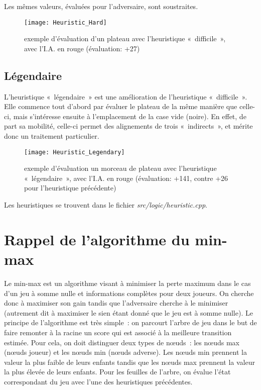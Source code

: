 Les mêmes valeurs, évaluées pour l'adversaire, sont soustraites.

\begin{figure}[H]
    \centering
    \texttt{[image: Heuristic\_Hard]}{}
    \caption{exemple d'évaluation d'un plateau avec l'heuristique « difficile », avec l'I.A. en rouge (évaluation: +27)}
\end{figure}

\subsection{Légendaire}

L'heuristique « légendaire » est une amélioration de l'heuristique « difficile ». Elle commence tout d'abord par évaluer
le plateau de la même manière que celle-ci, mais s'intéresse ensuite à l'emplacement de la case vide (noire). En effet,
de part sa mobilité, celle-ci permet des alignements de trois « indirects », et mérite donc un traitement particulier.

\begin{figure}[H]
    \centering
    \texttt{[image: Heuristic\_Legendary]}{}
    \caption{exemple d'évaluation un morceau de plateau avec l'heuristique « légendaire », avec l'I.A. en rouge (évaluation: +141, contre +26 pour l'heuristique précédente)}
\end{figure}

Les heuristiques se trouvent dans le fichier \emph{src/logic/heuristic.cpp}.

\section{Rappel de l'algorithme du min-max}

Le min-max est un algorithme visant à minimiser la perte maximum dans le cas d'un jeu à somme nulle
et informations complètes pour deux joueurs. On cherche donc à
maximiser son gain tandis que l'adversaire cherche à le minimiser (autrement dit à maximiser le
sien étant donné que le jeu est à somme nulle).
Le principe de l'algorithme est très simple : on parcourt l'arbre de jeu dans le but de faire remonter
à la racine un score qui est associé à la meilleure transition estimée.
Pour cela, on doit distinguer deux types de nœuds : les nœuds max (nœuds joueur) et les nœuds min (nœuds adverse).
Les nœuds min prennent la valeur la plus faible de leurs enfants tandis que les nœuds max prennent la valeur la
plus élevée de leurs enfants.
Pour les feuilles de l'arbre, on évalue l'état correspondant du jeu avec l'une des heuristiques précédentes.

